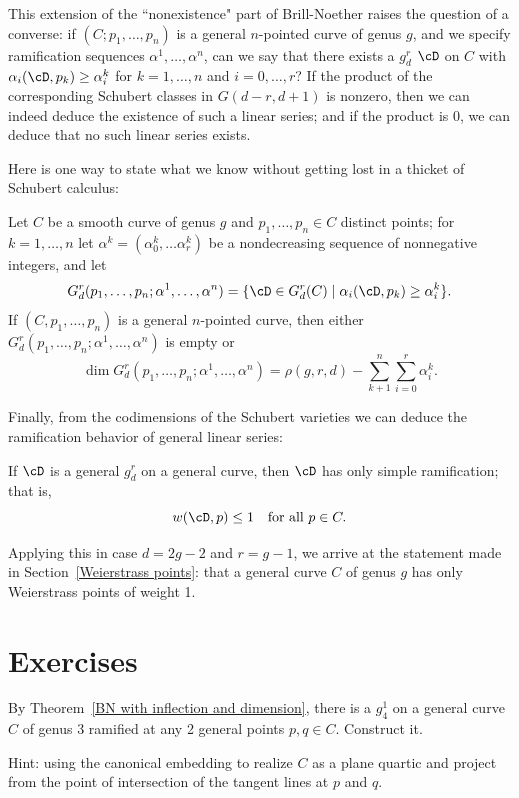 This extension of the ``nonexistence" part of Brill-Noether raises the question of a converse: if $(C;p_1,\dots,p_n)$ is a general $n$-pointed curve of genus $g$, and we specify ramification sequences $\alpha^1, \dots, \alpha^n$, can we say that there exists a $g^r_d$ $\cD$ on $C$ with $\alpha_i(\cD, p_k) \geq \alpha^k_i$ for $k=1,\dots,n$ and $i = 0, \dots, r$? If the product of the corresponding Schubert classes in $G(d-r, d+1)$ is nonzero, then we can indeed deduce the existence of such a linear series; and if the product is 0, we can deduce that no such linear series exists.

Here is one way to state what we know without getting lost in a thicket of Schubert calculus:

\begin{theorem}\label{BN with inflection and dimension}
Let $C$ be a smooth curve of genus $g$ and $p_1,\dots,p_n \in C$ distinct points; for $k = 1,\dots,n$ let $\alpha^k = (\alpha^k_0,\dots\alpha^k_r)$ be a nondecreasing sequence of nonnegative integers, and let
$$
G^r_d(p_1,\dots,p_n; \alpha^1,\dots,\alpha^n) = \{\cD \in G^r_d(C) \mid \alpha_i(\cD, p_k) \geq \alpha^k_i \}.
$$
If $(C, p_1,\dots,p_n)$ is a general $n$-pointed curve, then either $G^r_d(p_1,\dots,p_n; \alpha^1,\dots,\alpha^n)$ is empty or
$$
\dim G^r_d(p_1,\dots,p_n; \alpha^1,\dots,\alpha^n) = \rho(g,r,d) - \sum_{k+1}^n \sum_{i=0}^r \alpha^k_i.
$$
\end{theorem}

Finally, from the codimensions of the Schubert varieties  we can deduce the ramification behavior of general
linear series:

\begin{theorem}
If $\cD$ is a general $g^r_d$ on a general curve, then $\cD$ has only simple ramification; that is,	
$$
w(\cD, p) \leq 1 \quad \text{for all } p \in C.
$$
\end{theorem}

Applying this in case $d=2g-2$ and $r = g-1$, we arrive at the statement made in Section~\ref{Weierstrass points}: that a general curve $C$ of genus $g$ has only Weierstrass points of weight 1.

\section{Exercises}

\begin{exercise}
  By Theorem~\ref{BN with inflection and dimension}, there is a $g^1_4$ on a general curve $C$ of genus 3 ramified at any 2 general points $p, q \in C$. Construct it.
  
  Hint: using the canonical embedding to realize $C$ as a plane quartic and project from the point of intersection of the tangent lines at $p$ and $q$.
\end{exercise}

